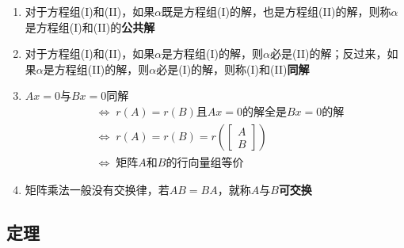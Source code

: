 \documentclass[a4paper,12pt]{article}
\begin{document}
\begin{enumerate}
        \item 对于方程组(I)和(II)，如果$\alpha$既是方程组(I)的解，也是方程组(II)的解，则称$\alpha$是方程组(I)和(II)的\textbf{公共解}
        \item 对于方程组(I)和(II)，如果$\alpha$是方程组(I)的解，则$\alpha$必是(II)的解；反过来，如果$\alpha$是方程组(II)的解，则$\alpha$必是(I)的解，则称(I)和(II)\textbf{同解}
        \item $Ax = 0$与$Bx = 0$同解
        \begin{align*}
            &\Leftrightarrow\; r(A) = r(B)\text{且}Ax = 0 \text{的解全是} Bx = 0\text{的解} \\
            &\Leftrightarrow\; r(A) = r(B) = r\!\left(\begin{bmatrix}
                                                          A \\ B
            \end{bmatrix}\right) \\
            &\Leftrightarrow\; \text{矩阵}A\text{和}B\text{的行向量组等价}
        \end{align*}
        \item 矩阵乘法一般没有交换律，若$AB = BA$，就称$A$与$B$\textbf{可交换}
    \end{enumerate}

    \subsection{定理}
\end{document}

